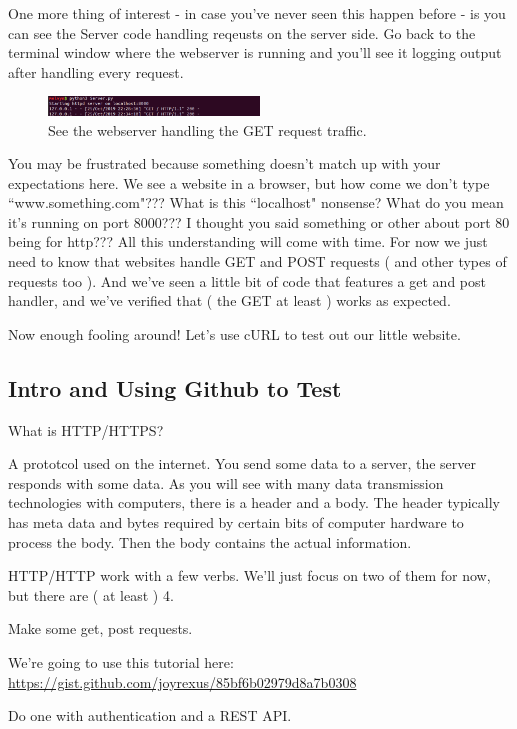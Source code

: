 \documentclass[10pt]{article}
\begin{document}
One more thing of interest - in case you've never seen this happen before - is you can see the Server code handling reqeusts on the server side. Go back to the terminal window where the webserver is running and you'll see it logging output after handling every request.

\begin{figure}[h]
  \centering
    \includegraphics[width=0.5\textwidth]{GET_ServerSide.png}
  \caption{See the webserver handling the GET request traffic. }
\end{figure}

You may be frustrated because something doesn't match up with your expectations here. We see a website in a browser, but how come we don't type ``www.something.com"??? What is this ``localhost" nonsense? What do you mean it's running on port 8000??? I thought you said something or other about port 80 being for http??? All this understanding will come with time. For now we just need to know that websites handle GET and POST requests ( and other types of requests too ). And we've seen a little bit of code that features a get and post handler, and we've verified that ( the GET at least ) works as expected.

Now enough fooling around! Let's use cURL to test out our little website.




\subsection{Intro and Using Github to Test}
What is HTTP/HTTPS?

A prototcol used on the internet. You send some data to a server, the server responds with some data. As you will see with many data transmission technologies with computers, there is a header and a body. The header typically has meta data and bytes required by certain bits of computer hardware to process the body. Then the body contains the actual information.

HTTP/HTTP work with a few verbs. We'll just focus on two of them for now, but there are ( at least ) 4. 

Make some get, post requests. 

We're going to use this tutorial here:
\url{https://gist.github.com/joyrexus/85bf6b02979d8a7b0308}

Do one with authentication and a REST API.
\end{document}
